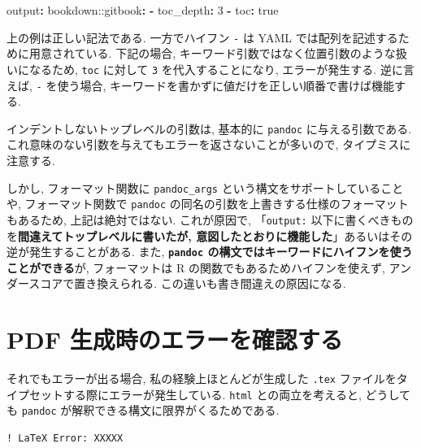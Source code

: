 \documentclass[
  xelatex,ja=standard,jafont=noto]{bxjsbook}
\newenvironment{Shaded}{\begin{snugshade}}{\end{snugshade}}
\newcommand{\AttributeTok}[1]{\textcolor[rgb]{0.77,0.63,0.00}{#1}}
\newcommand{\CharTok}[1]{\textcolor[rgb]{0.31,0.60,0.02}{#1}}
\newcommand{\DecValTok}[1]{\textcolor[rgb]{0.00,0.00,0.81}{#1}}
\newcommand{\FunctionTok}[1]{\textcolor[rgb]{0.00,0.00,0.00}{#1}}
\newcommand{\KeywordTok}[1]{\textcolor[rgb]{0.13,0.29,0.53}{\textbf{#1}}}
\theoremstyle{definition}
\theoremstyle{definition}
\theoremstyle{definition}
\theoremstyle{definition}
\theoremstyle{remark}
\begin{document}
\begin{Shaded}
\begin{Highlighting}[]
\FunctionTok{output}\KeywordTok{:}
\AttributeTok{  bookdown:}\FunctionTok{:gitbook}\KeywordTok{:}
\AttributeTok{    }\KeywordTok{{-}}\AttributeTok{ }\FunctionTok{toc\_depth}\KeywordTok{:}\AttributeTok{ }\DecValTok{3}
\AttributeTok{    }\KeywordTok{{-}}\AttributeTok{ }\FunctionTok{toc}\KeywordTok{:}\AttributeTok{ }\CharTok{true}
\end{Highlighting}
\end{Shaded}

上の例は正しい記法である. 一方でハイフン \texttt{-} は YAML
では配列を記述するために用意されている. 下記の場合,
キーワード引数ではなく位置引数のような扱いになるため, \texttt{toc}
に対して \texttt{3} を代入することになり, エラーが発生する. 逆に言えば,
\texttt{-} を使う場合,
キーワードを書かずに値だけを正しい順番で書けば機能する.

インデントしないトップレベルの引数は, 基本的に \texttt{pandoc}
に与える引数である.
これ意味のない引数を与えてもエラーを返さないことが多いので,
タイプミスに注意する.

しかし, フォーマット関数に \texttt{pandoc\_args}
という構文をサポートしていることや, フォーマット関数で \texttt{pandoc}
の同名の引数を上書きする仕様のフォーマットもあるため,
上記は絶対ではない. これが原因で, 「\texttt{output:}
以下に書くべきものを\textbf{間違えてトップレベルに書いたが,
意図したとおりに機能した}」あるいはその逆が発生することがある. また,
\textbf{\texttt{pandoc}
の構文ではキーワードにハイフンを使うことができる}が, フォーマットは R
の関数でもあるためハイフンを使えず, アンダースコアで置き換えられる.
この違いも書き間違えの原因になる.

\hypertarget{pdf-ux751fux6210ux6642ux306eux30a8ux30e9ux30fcux3092ux78baux8a8dux3059ux308b}{%
\section{PDF
生成時のエラーを確認する}\label{pdf-ux751fux6210ux6642ux306eux30a8ux30e9ux30fcux3092ux78baux8a8dux3059ux308b}}

それでもエラーが出る場合, 私の経験上ほとんどが生成した \texttt{.tex}
ファイルをタイプセットする際にエラーが発生している. \texttt{html}
との両立を考えると, どうしても \texttt{pandoc}
が解釈できる構文に限界がくるためである.

\begin{verbatim}
! LaTeX Error: XXXXX
\end{verbatim}
\end{document}
